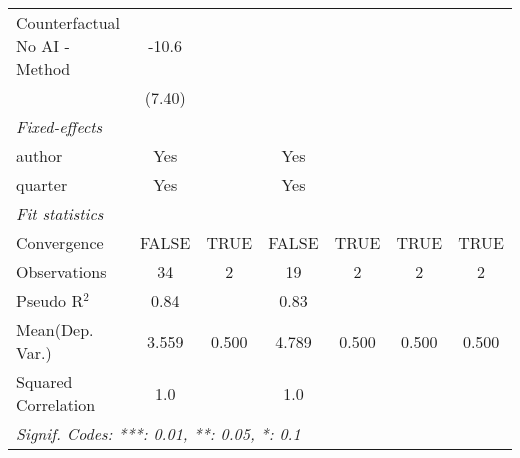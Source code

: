 \begin{tabular}{lcccccc}
   Counterfactual No AI - Method & -10.6        &      &             &      &      &   \\   
                                 & (7.40)       &      &             &      &      &   \\   
   \midrule
   \emph{Fixed-effects}\\
   author                        & Yes          &      & Yes         &      &      & \\  
   quarter                       & Yes          &      & Yes         &      &      & \\  
   \midrule
   \emph{Fit statistics}\\
   Convergence                   &FALSE         & TRUE & FALSE       & TRUE & TRUE & TRUE\\  
   Observations                  & 34           & 2    & 19          & 2    & 2    & 2\\  
   Pseudo R$^2$                  & 0.84         &      & 0.83        &      &      & \\  
Mean(Dep. Var.) & 3.559 & 0.500 & 4.789 & 0.500 & 0.500 & 0.500 \\
   Squared Correlation           & 1.0          &      & 1.0         &      &      & \\  
   \midrule \midrule
   \multicolumn{7}{l}{\emph{Signif. Codes: ***: 0.01, **: 0.05, *: 0.1}}\\
\end{tabular}
\par\endgroup
